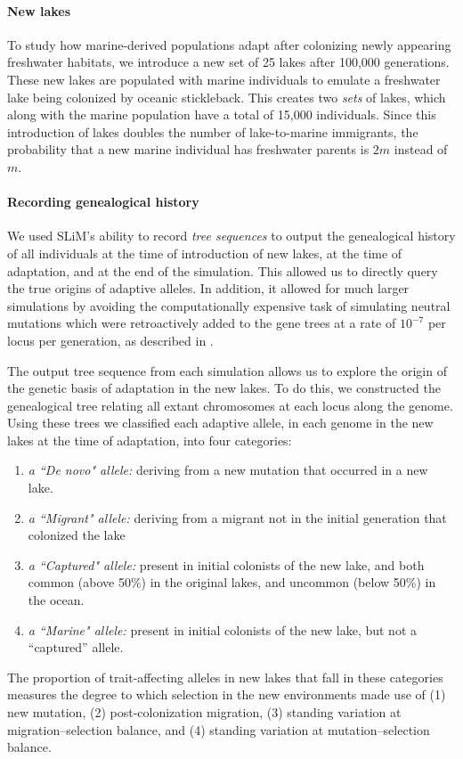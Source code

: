 \documentclass{article}
\begin{document}
\paragraph{New lakes} 
To study how marine-derived populations adapt after colonizing newly appearing freshwater habitats,
we introduce a new set of 25 lakes after 100,000 generations.
These new lakes are populated with marine individuals to emulate a freshwater lake being colonized by
oceanic stickleback.
This creates two \emph{sets} of lakes, which along with the marine population have a total of 15,000 individuals.
Since this introduction of lakes doubles the number of lake-to-marine immigrants, 
the probability that a new marine individual has freshwater parents is $2m$ instead of $m$.

\paragraph{Recording genealogical history}
We used SLiM's ability to record \emph{tree sequences} \citep{haller2018treesequence,Kelleher2016}
to output the genealogical history of all individuals
at the time of introduction of new lakes, at the time of adaptation, and at the end of the simulation.
This allowed us to directly query the true origins of adaptive alleles.
In addition, it allowed for much larger simulations by avoiding the computationally expensive task of simulating neutral mutations
which were retroactively added to the gene trees at a rate of $10^{-7}$ per locus per generation, as described in \citet{kelleher2018efficient}.

The output tree sequence from each simulation allows us to explore the origin of the genetic basis of adaptation in the new lakes. 
To do this, we constructed the genealogical tree relating all extant chromosomes at each locus along the genome.
Using these trees we classified each adaptive allele, in each genome in the new lakes at the time of adaptation, into four categories:
\begin{enumerate}
    \item \emph{a ``De novo" allele:}
        deriving from a new mutation that occurred in a new lake.
    \item \emph{a ``Migrant" allele:} 
        deriving from a migrant not in the initial generation that colonized the lake
    \item \emph{a ``Captured" allele:}
        present in initial colonists of the new lake, 
        and both common (above 50\%) in the original lakes,
        and uncommon (below 50\%) in the ocean.
    \item \emph{a ``Marine" allele:} 
        present in initial colonists of the new lake, 
        but not a ``captured'' allele.
\end{enumerate}
The proportion of trait-affecting alleles in new lakes that fall in these categories
measures the degree to which selection in the new environments made use of
(1) new mutation, 
(2) post-colonization migration, 
(3) standing variation at migration--selection balance, and
(4) standing variation at mutation--selection balance.
\end{document}
